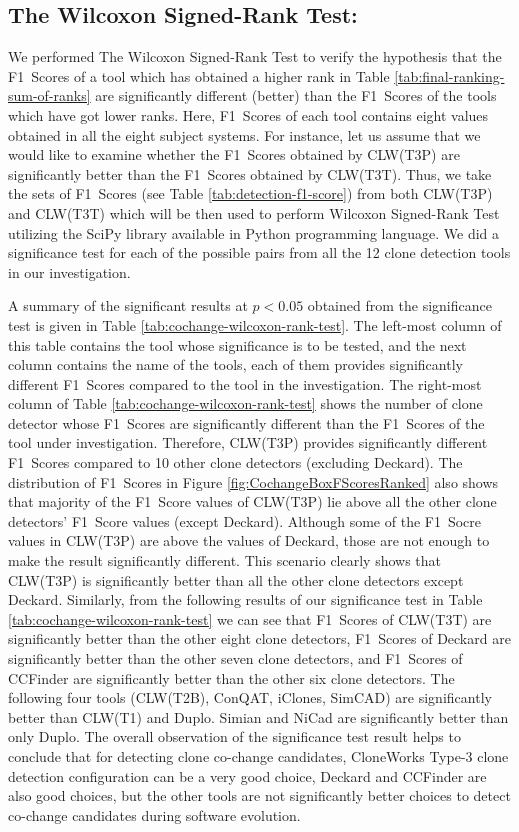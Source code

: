 \documentclass[review]{elsarticle}
\begin{document}
\subsection{The Wilcoxon Signed-Rank Test:}
\label{sec-wilcoxon-singed-rank-test}
We performed The Wilcoxon Signed-Rank Test \cite{wilcoxon-signed-rank-test, wilcoxon-signed-rank-test-rosner} to verify the hypothesis that the F1~Scores of a tool which has obtained a higher rank in Table \ref{tab:final-ranking-sum-of-ranks} are significantly different (better) than the F1~Scores of the tools which have got lower ranks. Here, F1~Scores of each tool contains eight values obtained in all the eight subject systems. For instance, let us assume that we would like to examine whether the F1~Scores obtained by CLW(T3P) are significantly better than the F1~Scores obtained by CLW(T3T). Thus, we take the sets of F1~Scores (see Table \ref{tab:detection-f1-score}) from both CLW(T3P) and CLW(T3T) which will be then used to perform Wilcoxon Signed-Rank Test utilizing the SciPy library \cite{SciPy-NMeth2020} available in Python programming language. We did a significance test for each of the possible pairs from all the 12 clone detection tools in our investigation. 

A summary of the significant results at $p<0.05$ obtained from the significance test is given in Table \ref{tab:cochange-wilcoxon-rank-test}. The left-most column of this table contains the tool whose significance is to be tested, and the next column contains the name of the tools, each of them provides significantly different F1~Scores compared to the tool in the investigation. The right-most column of Table \ref{tab:cochange-wilcoxon-rank-test} shows the number of clone detector whose F1~Scores are significantly different than the F1~Scores of the tool under investigation. Therefore, CLW(T3P) provides significantly different F1~Scores compared to 10 other clone detectors (excluding Deckard). The distribution of F1~Scores in Figure \ref{fig:CochangeBoxFScoresRanked} also shows that majority of the F1~Score values of CLW(T3P) lie above all the other clone detectors'  F1~Score values (except Deckard). Although some of the F1~Socre values in CLW(T3P) are above the values of Deckard, those are not enough to make the result significantly different. This scenario clearly shows that CLW(T3P) is significantly better than all the other clone detectors except Deckard. Similarly, from the following results of our significance test in Table \ref{tab:cochange-wilcoxon-rank-test} we can see that F1~Scores of CLW(T3T) are significantly better than the other eight clone detectors, F1~Scores of Deckard are significantly better than the other seven clone detectors, and F1~Scores of CCFinder are significantly better than the other six clone detectors. The following four tools (CLW(T2B), ConQAT, iClones, SimCAD) are significantly better than CLW(T1) and Duplo. Simian and NiCad are significantly better than only Duplo. The overall observation of the significance test result helps to conclude that for detecting clone co-change candidates, CloneWorks Type-3 clone detection configuration can be a very good choice, Deckard and CCFinder are also good choices, but the other tools are not significantly better choices to detect co-change candidates during software evolution. 
\end{document}
